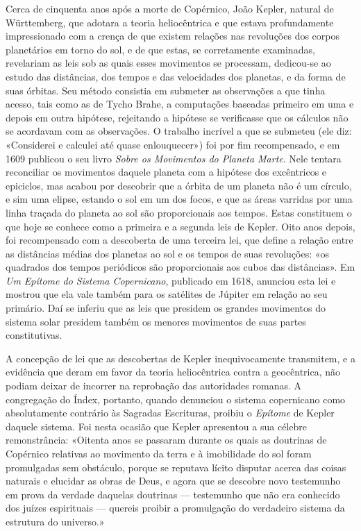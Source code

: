 \documentclass[11pt,a5paper,twoside,openany]{book}
\begin{document}
Cerca de cinquenta anos após a morte de Copérnico, João Kepler, natural de Württemberg, que adotara a teoria heliocêntrica e que estava profundamente impressionado com a crença de que existem relações nas revoluções dos corpos planetários em torno do sol, e de que estas, se corretamente examinadas, revelariam as leis sob as quais esses movimentos se processam, dedicou-se ao estudo das distâncias, dos tempos e das velocidades dos planetas, e da forma de suas órbitas. Seu método consistia em submeter as observações a que tinha acesso, tais como as de Tycho Brahe, a computações baseadas primeiro em uma e depois em outra hipótese, rejeitando a hipótese se verificasse que os cálculos não se acordavam com as observações. O trabalho incrível a que se submeteu (ele diz: «Considerei e calculei até quase enlouquecer») foi por fim recompensado, e em 1609 publicou o seu livro \textit{Sobre os Movimentos do Planeta Marte}. Nele tentara reconciliar os movimentos daquele planeta com a hipótese dos excêntricos e epiciclos, mas acabou por descobrir que a órbita de um planeta não é um círculo, e sim uma elipse, estando o sol em um dos focos, e que as áreas varridas por uma linha traçada do planeta ao sol são proporcionais aos tempos. Estas constituem o que hoje se conhece como a primeira e a segunda leis de Kepler. Oito anos depois, foi recompensado com a descoberta de uma terceira lei, que define a relação entre as distâncias médias dos planetas ao sol e os tempos de suas revoluções: «os quadrados dos tempos periódicos são proporcionais aos cubos das distâncias». Em \textit{Um Epítome do Sistema Copernicano}, publicado em 1618, anunciou esta lei e mostrou que ela vale também para os satélites de Júpiter em relação ao seu primário. Daí se inferiu que as leis que presidem os grandes movimentos do sistema solar presidem também os menores movimentos de suas partes constitutivas.

A concepção de lei que as descobertas de Kepler inequivocamente transmitem, e a evidência que deram em favor da teoria heliocêntrica contra a geocêntrica, não podiam deixar de incorrer na reprobação das autoridades romanas. A congregação do Índex, portanto, quando denunciou o sistema copernicano como absolutamente contrário às Sagradas Escrituras, proibiu o \textit{Epítome} de Kepler daquele sistema. Foi nesta ocasião que Kepler apresentou a sua célebre remonstrância: «Oitenta anos se passaram durante os quais as doutrinas de Copérnico relativas ao movimento da terra e à imobilidade do sol foram promulgadas sem obstáculo, porque se reputava lícito disputar acerca das coisas naturais e elucidar as obras de Deus, e agora que se descobre novo testemunho em prova da verdade daquelas doutrinas — testemunho que não era conhecido dos juízes espirituais — quereis proibir a promulgação do verdadeiro sistema da estrutura do universo.»
\end{document}
